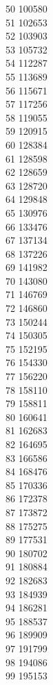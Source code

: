 { 50	100580 \\
 51	102653 \\
 52	103903 \\
 53	105732 \\
 54	112287 \\
 55	113689 \\
 56	115671 \\
 57	117256 \\
 58	119055 \\
 59	120915 \\
 60	128384 \\
 61	128598 \\
 62	128659 \\
 63	128720 \\
 64	129848 \\
 65	130976 \\
 66	133476 \\
 67	137134 \\
 68	137226 \\
 69	141982 \\
 70	143080 \\
 71	146769 \\
 72	146860 \\
 73	150244 \\
 74	150305 \\
 75	152195 \\
 76	154330 \\
 77	156220 \\
 78	158110 \\
 79	158811 \\
 80	160641 \\
 81	162683 \\
 82	164695 \\
 83	166586 \\
 84	168476 \\
 85	170336 \\
 86	172378 \\
 87	173872 \\
 88	175275 \\
 89	177531 \\
 90	180702 \\
 91	180884 \\
 92	182683 \\
 93	184939 \\
 94	186281 \\
 95	188537 \\
 96	189909 \\
 97	191799 \\
 98	194086 \\
 99	195153 \\
}
